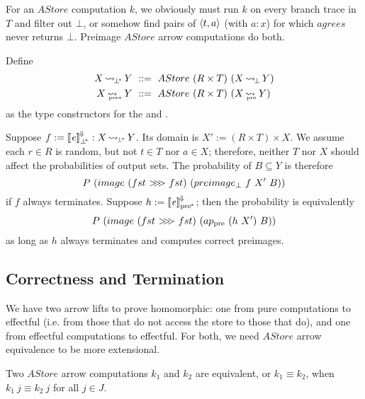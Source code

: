 \documentclass{llncs}
\newcommand{\arrow}{\rightsquigarrow}
\newcommand{\conv}{^{\mspace{-2mu}\Downarrow\mspace{-2mu}}}
\newcommand{\meaningofconv}[1]{\left\llbracket{#1}\right\rrbracket\conv}
\newcommand{\arrowcomp}{\ensuremath{{>}\mspace{-6mu}{>}\mspace{-6mu}{>}}}
\DeclareMathOperator{\botto}{\arrow_{\mspace{-3mu}\bot}}
\newcommand{\pre}{_\mathrm{pre}}
\DeclareMathOperator{\preto}{\arrow_{\mspace{-19mu}\pre}}
\newcommand{\pbot}{{\bot^{\mspace{-4mu}*}}}
\DeclareMathOperator{\pbotto}{\arrow_{\mspace{-3mu}\pbot}}
\newcommand{\ppre}{_\mathrm{pre^{\mspace{-2mu}*}}}
\DeclareMathOperator{\ppreto}{\arrow_{\mspace{-19mu}_{\mathrm{pre*}}}}
\begin{document}
For an $AStore$ computation $k$, we obviously must run $k$ on every branch trace in $T$ and filter out $\bot$, or somehow find pairs of $\langle{t,a}\rangle$ (with $a : x$) for which $agrees$ never returns $\bot$.
Preimage $AStore$ arrow computations do both.

\begin{definition}
Define
\begin{equation}
\begin{aligned}
	X \pbotto Y &\ ::=\ AStore~(R \times T)~(X \botto Y) \\
	X \ppreto Y &\ ::=\ AStore~(R \times T)~(X \preto Y) \\
\end{aligned}
\end{equation}
as the type constructors for the  and .
\end{definition}

Suppose $f := \meaningofconv{\mathit{e}}_\pbot : X \pbotto Y$.
Its domain is $X' := (R \times T) \times X$.
We assume each $r \in R$ is random, but not $t \in T$ nor $a \in X$; therefore, neither $T$ nor $X$ should affect the probabilities of output sets.
The probability of $B \subseteq Y$ is therefore
\begin{equation}
	P~(image~(fst~\arrowcomp~fst)~(preimage_\bot~f~X'~B))
\end{equation}
if $f$ always terminates.
Suppose $h := \meaningofconv{\mathit{e}}\ppre$; then the probability is equivalently
\begin{equation}
	P~(image~(fst~\arrowcomp~fst)~(ap\pre~(h~X')~B))
\end{equation}
as long as $h$ always terminates and computes correct preimages.

\subsection{Correctness and Termination}

We have two arrow lifts to prove homomorphic: one from pure computations to effectful (i.e. from those that do not access the store to those that do), and one from effectful computations to effectful.
For both, we need $AStore$ arrow equivalence to be more extensional.

\begin{definition}
Two $AStore$ arrow computations $k_1$ and $k_2$ are equivalent, or $k_1 \equiv k_2$, when $k_1~j \equiv k_2~j$ for all $j \in J$.
\end{definition}
\end{document}
